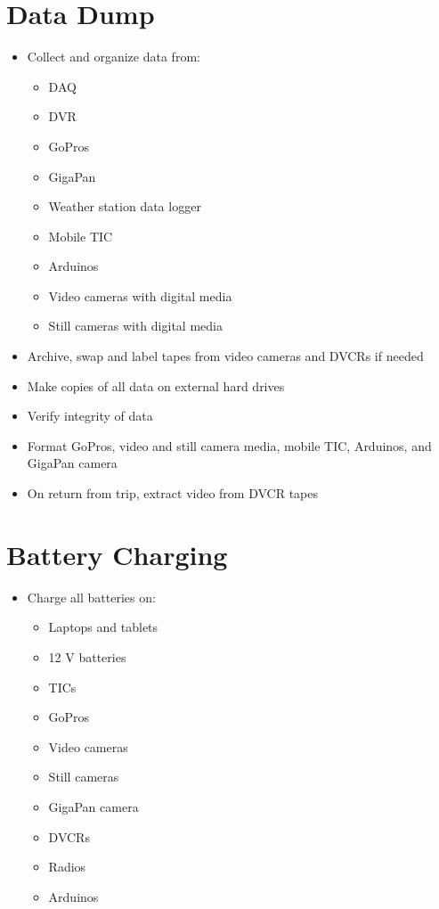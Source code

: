\documentclass[11pt,oneside]{book}
\begin{document}
\section{Data Dump}

\begin{itemize}
\item Collect and organize data from:
    \begin{itemize}
    \item DAQ
    \item DVR
    \item GoPros
    \item GigaPan
    \item Weather station data logger
    \item Mobile TIC
    \item Arduinos
    \item Video cameras with digital media
    \item Still cameras with digital media
    \end{itemize}

\item Archive, swap and label tapes from video cameras and DVCRs if needed

\item Make copies of all data on external hard drives

\item Verify integrity of data

\item Format GoPros, video and still camera media, mobile TIC, Arduinos, and GigaPan camera

\item On return from trip, extract video from DVCR tapes
\end{itemize}

\section{Battery Charging}

\begin{itemize}
\item Charge all batteries on:
    \begin{itemize}
    \item Laptops and tablets
    \item 12 V batteries
    \item TICs
    \item GoPros
    \item Video cameras
    \item Still cameras
    \item GigaPan camera
    \item DVCRs
    \item Radios
    \item Arduinos
    \end{itemize}
\end{itemize}
\end{document}
